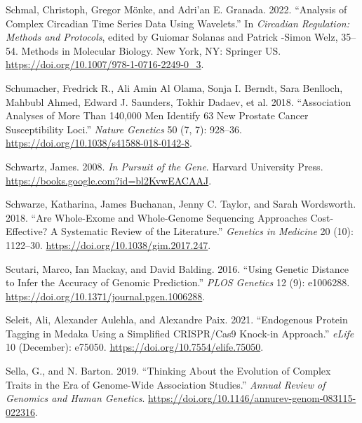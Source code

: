 \documentclass[
]{book}
\newlength{\cslhangindent}
\newlength{\cslentryspacingunit} %
\newenvironment{CSLReferences}[2] %
 {%
  \setlength{\parindent}{0pt}
  \ifodd #1
  \let\oldpar\par
  \def\par{\hangindent=\cslhangindent\oldpar}
  \fi
  \setlength{\parskip}{#2\cslentryspacingunit}
 }%
 {}
\begin{document}
\begin{CSLReferences}{1}{0}
\leavevmode{}%
Schmal, Christoph, Gregor Mönke, and Adri'an E. Granada. 2022. {``Analysis of {Complex Circadian Time Series Data Using Wavelets}.''} In \emph{Circadian {Regulation}: {Methods} and {Protocols}}, edited by Guiomar Solanas and Patrick -Simon Welz, 35--54. Methods in {Molecular Biology}. {New York, NY}: {Springer US}. \url{https://doi.org/10.1007/978-1-0716-2249-0_3}.

\leavevmode{}%
Schumacher, Fredrick R., Ali Amin Al Olama, Sonja I. Berndt, Sara Benlloch, Mahbubl Ahmed, Edward J. Saunders, Tokhir Dadaev, et al. 2018. {``Association Analyses of More Than 140,000 Men Identify 63 New Prostate Cancer Susceptibility Loci.''} \emph{Nature Genetics} 50 (7, 7): 928--36. \url{https://doi.org/10.1038/s41588-018-0142-8}.

\leavevmode{}%
Schwartz, James. 2008. \emph{In {Pursuit} of the {Gene}}. {Harvard University Press}. \url{https://books.google.com?id=bl2KvwEACAAJ}.

\leavevmode{}%
Schwarze, Katharina, James Buchanan, Jenny C. Taylor, and Sarah Wordsworth. 2018. {``Are Whole-Exome and Whole-Genome Sequencing Approaches Cost-Effective? {A} Systematic Review of the Literature.''} \emph{Genetics in Medicine} 20 (10): 1122--30. \url{https://doi.org/10.1038/gim.2017.247}.

\leavevmode{}%
Scutari, Marco, Ian Mackay, and David Balding. 2016. {``Using {Genetic Distance} to {Infer} the {Accuracy} of {Genomic Prediction}.''} \emph{PLOS Genetics} 12 (9): e1006288. \url{https://doi.org/10.1371/journal.pgen.1006288}.

\leavevmode{}%
Seleit, Ali, Alexander Aulehla, and Alexandre Paix. 2021. {``Endogenous Protein Tagging in Medaka Using a Simplified {CRISPR}/{Cas9} Knock-in Approach.''} \emph{eLife} 10 (December): e75050. \url{https://doi.org/10.7554/elife.75050}.

\leavevmode{}%
Sella, G., and N. Barton. 2019. {``Thinking {About} the {Evolution} of {Complex Traits} in the {Era} of {Genome-Wide Association Studies}.''} \emph{Annual Review of Genomics and Human Genetics}. \url{https://doi.org/10.1146/annurev-genom-083115-022316}.


\end{CSLReferences}
\end{document}
